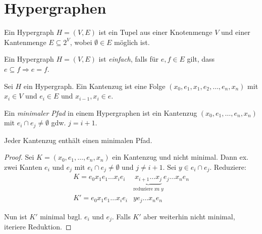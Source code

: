 \chapter{Hypergraphen}
\label{chpt:hypergraphs}

\begin{definition}[Hypergraph]
    Ein Hypergraph $ H = (V, E) $ ist ein Tupel aus einer Knotenmenge $ V $ und einer Kantenmenge $ E \subseteq 2^V $, wobei $ \emptyset \in E $ möglich ist.
\end{definition}

\begin{definition}[Einfach]
    Ein Hypergraph $ H = (V, E) $ ist \textit{einfach}, falls für $ e, f \in E $ gilt, dass $ e \subseteq f \Rightarrow e = f $.
\end{definition}

\begin{definition}
    Sei $ H $ ein Hypergraph.
    Ein Kantenzug ist eine Folge $ (x_0, e_1, x_1, e_2, \dots, e_n, x_n) $ mit $ x_i \in V $ und $ e_i \in E $ und $ x_{i - 1}, x_i \in e $.
\end{definition}

\begin{definition}
    Ein \textit{minimaler Pfad} in einem Hypergraphen ist ein Kantenzug $ (x_0, e_1, \dots, e_n, x_n) $ mit $ e_i \cap e_j \ne \emptyset $ gdw. $ j = i + 1 $.
\end{definition}

\begin{lemma}
    Jeder Kantenzug enthält einen minimalen Pfad.
\end{lemma}

\begin{proof}
    Sei $ K = (x_0, e_1, \dots, e_n, x_n) $ ein Kantenzug und nicht minimal.
    Dann ex. zwei Kanten $ e_i $ und $ e_j $ mit $ e_i \cap e_j \ne \emptyset $ und $ j \ne i + 1 $.
    Sei $ y \in e_i \cap e_j $.
    Reduziere:
    \begin{align*}
        K = e_0 x_1 e_1 \dots x_i e_i & \underbrace{x_{i + 1} \dots x_j}_{\text{reduziere zu } y} e_j \dots x_n e_n \\
        K' = e_0 x_1 e_1 \dots x_i e_i & y e_j \dots x_n e_n
    \end{align*}

    Nun ist $ K' $ minimal bzgl. $ e_i $ und $ e_j $.
    Falls $ K' $ aber weiterhin nicht minimal, iteriere Reduktion.
\end{proof}

